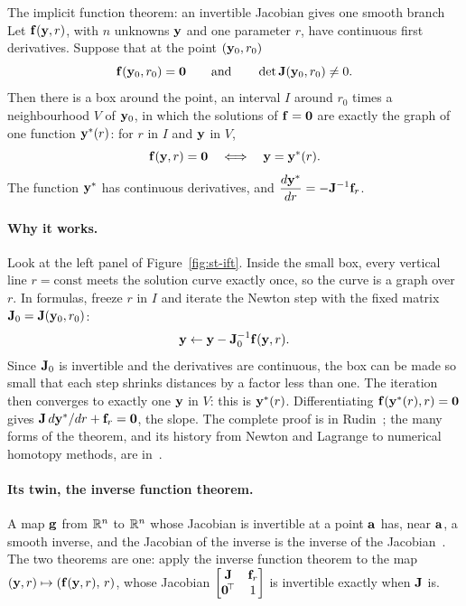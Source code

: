 \begin{gbox}{The implicit function theorem: an invertible Jacobian gives one smooth branch}\label{sec:st-iftn}
%
Let $\mathbf{f}(\mathbf{y},r)$, with $n$ unknowns $\mathbf{y}$ and one parameter $r$, have
continuous first derivatives. Suppose that at the point $(\mathbf{y}_0,r_0)$
\begin{equation}\label{eq:st-iftcond}
  \mathbf{f}(\mathbf{y}_0,r_0) = \mathbf{0}
  \qquad\text{and}\qquad
  \det\mathbf{J}(\mathbf{y}_0,r_0) \neq 0 .
\end{equation}
Then there is a box around the point, an interval $I$ around $r_0$ times a
neighbourhood $V$ of $\mathbf{y}_0$, in which the solutions of $\mathbf{f} = \mathbf{0}$ are
exactly the graph of one function $\mathbf{y}^*(r)$: for $r$ in $I$ and $\mathbf{y}$ in
$V$,
\begin{equation}\label{eq:st-iftgraph}
  \mathbf{f}(\mathbf{y},r) = \mathbf{0}
  \quad\Longleftrightarrow\quad
  \mathbf{y} = \mathbf{y}^*(r).
\end{equation}
The function $\mathbf{y}^*$ has continuous derivatives, and
$\displaystyle\frac{d\mathbf{y}^*}{dr} = -\mathbf{J}^{-1}\mathbf{f}_r$.
\end{gbox}

\paragraph{Why it works.}
Look at the left panel of Figure~\ref{fig:st-ift}. Inside the small box, every
vertical line $r = \text{const}$ meets the solution curve exactly once, so the
curve is a graph over $r$. In formulas, freeze $r$ in $I$ and iterate the Newton
step with the fixed matrix $\mathbf{J}_0 = \mathbf{J}(\mathbf{y}_0,r_0)$:
\[
  \mathbf{y} \leftarrow \mathbf{y} - \mathbf{J}_0^{-1}\mathbf{f}(\mathbf{y},r).
\]
Since $\mathbf{J}_0$ is invertible and the derivatives are continuous, the box can be
made so small that each step shrinks distances by a factor less than one. The
iteration then converges to exactly one $\mathbf{y}$ in $V$: this is $\mathbf{y}^*(r)$.
Differentiating $\mathbf{f}(\mathbf{y}^*(r),r) = \mathbf{0}$ gives
$\mathbf{J}\,d\mathbf{y}^*/dr + \mathbf{f}_r = \mathbf{0}$, the slope. The complete proof is in
Rudin~\cite[Theorem~9.28]{st-rudin1976}; the many forms of the theorem, and its
history from Newton and Lagrange to numerical homotopy methods, are
in~\cite{st-krantz2002}.

\paragraph{Its twin, the inverse function theorem.}
%
A map $\mathbf{g}$ from $\mathbb{R}^n$ to $\mathbb{R}^n$ whose Jacobian is invertible at a point
$\mathbf{a}$ has, near $\mathbf{a}$, a smooth inverse, and the Jacobian of the inverse is
the inverse of the Jacobian~\cite[Theorem~9.24]{st-rudin1976}. The two theorems are
one: apply the inverse function theorem to the map
$(\mathbf{y},r) \mapsto (\mathbf{f}(\mathbf{y},r),\,r)$, whose Jacobian
$\begin{bmatrix}\mathbf{J} & \mathbf{f}_r\\ \mathbf{0}^{\!\top} & 1\end{bmatrix}$ is invertible
exactly when $\mathbf{J}$ is.

